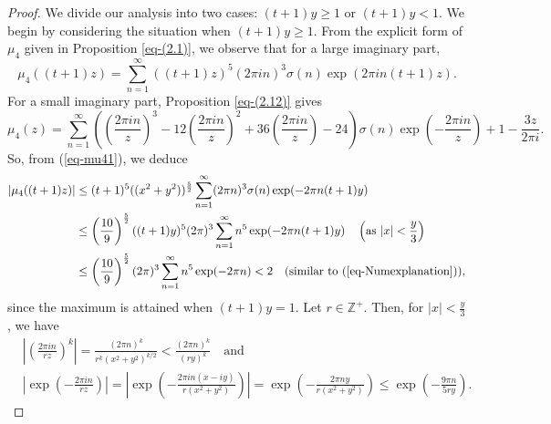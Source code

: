 \documentclass[11pt]{amsart}
\theoremstyle{plain}
\numberwithin{equation}{section}
\begin{document}
		\begin{proof}
			We divide our analysis into two cases: $(t+1)y\ge 1$ or $(t+1)y<1.$
			\newline
			We begin by considering the situation when $(t+1)y\ge 1.$
			From the explicit form of $\mu_{4}$ given in Proposition \ref{eq-(2.1)}, we observe that for a large imaginary part, 
			\begin{equation}\label{eq-mu41}
				\mu_{4}((t+1)z) =\sum_{n=1}^{\infty}((t+1)z)^{5}(2\pi in)^{3}\sigma(n)\exp(2\pi in(t+1)z).
			\end{equation}
			For a small imaginary part, Proposition \ref{eq-(2.12)} gives
			\begin{equation}\label{eq-mu42}
				\mu_{4}(z)=\sum_{n=1}^{\infty}\left(\left(\frac{2\pi in}{z}\right)^{3}-12\left(\frac{2\pi in}{z}\right)^{2}+36\left(\frac{2\pi in}{z}\right)-24\right)\sigma(n)\exp\left(-\frac{2\pi in}{z}\right)+1-\frac{3z}{2\pi i}.   
			\end{equation}
			So, from (\ref{eq-mu41}), we deduce
			\begin{equation}\label{eq-mu44}
				\begin{aligned}
					| \mu_{4}((t+1)z)| 
					&\le(t+1)^{5}((x^{2}+y^{2}))^{\frac{5}{2}}\sum_{n=1}^{\infty}(2\pi n)^{3}\sigma(n)\exp(-2\pi n(t+1)y)\\
					&\le \left(\frac{10}{9}\right)^{\frac{5}{2}}((t+1)y)^{5}(2\pi)^{3}\sum_{n=1}^{\infty}n^{5}\exp(-2\pi n(t+1)y) \quad\left(\text{as $|x|<\frac{y}{3}$}\right)\\
					&\le \left(\frac{10}{9}\right)^{\frac{5}{2}}(2\pi)^{3}\sum_{n=1}^{\infty}n^{5}\exp(-2\pi n)<2 \quad (\text{similar to (\ref{eq-Numexplanation})}),
				\end{aligned}
			\end{equation}
			since the maximum is attained when $(t+1)y=1$.\newline
			Let $r \in \mathbb{Z}^{+}$. Then, for $|x| < \frac{y}{3}$, we have
			\begin{equation}\label{eq-mu43}
				\begin{aligned}
					& \left|\left(\frac{2\pi in}{rz}\right)^{k}\right| =\frac{(2\pi n)^{k}}{r^{k}(x^{2}+y^{2})^{k/2}}<\frac{(2\pi n)^{k}}{(ry)^{k}} \quad \text{and}\\
					& \left|\exp\left(-\frac{2\pi in}{rz}\right)\right|= \left|\exp\left(-\frac{2\pi in(x-iy)}{r(x^{2}+y^{2})}\right)\right|=\exp\left(-\frac{2\pi ny}{r(x^{2}+y^{2})}\right)\le \exp\left(-\frac{9\pi n}{5ry}\right).
				\end{aligned}
			\end{equation}

\end{proof}
\end{document}
